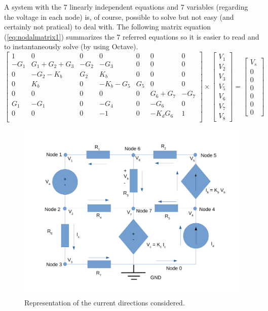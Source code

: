 A system with the 7 linearly independent equations and 7 variables (regarding the voltage in each node) is, of course, possible to solve but not easy (and certainly not pratical) to deal with. The following matrix equation (\ref{eq:nodalmatrix1}) summarizes the 7 referred equations so it is easier to read and to instantaneously solve (by using Octave).
\begin{equation}
\left[ \begin{array}{ccccccc} 
		1 & 0 & 0 & 0 & 0 & 0 & 0 \\ 
		-G_1 & G_1+G_2+G_3 & -G_2 & -G_3 & 0 & 0 & 0 \\
		0 & -G_2-K_b & G_2 & K_b & 0 & 0 & 0 \\ 
		0 & K_b & 0 & -K_b-G_5 & G_5 & 0 & 0  \\ 
		0 & 0 & 0 & 0 & 0 & G_6+G_7 & -G_7  \\ 
		G_1 & -G_1 & 0 & -G_4 & 0 & -G_6 & 0  \\ 
		0 & 0 & 0 & -1 & 0 & -K_dG_6 & 1 \\ 

\end{array} \right]
\times \left[ \begin{array}{c} V_1 \\ V_2 \\ V_3 \\  V_5 \\ V_6 \\ V_7 \\ V_8 \end{array} \right] =
\left[ \begin{array}{c} V_s \\ 0 \\ 0 \\ 0 \\ 0 \\ 0 \\ 0  \end{array} \right]
\label{eq:nodalmatrix1}
\end{equation}

\label{sec:Exercise 1}
\begin{figure}[!ht] \centering
\includegraphics[width=0.8\linewidth]{circuit_node.pdf}
\caption{Representation of the current directions considered.}
\label{fig:nodeanalysis1}
\end{figure}


